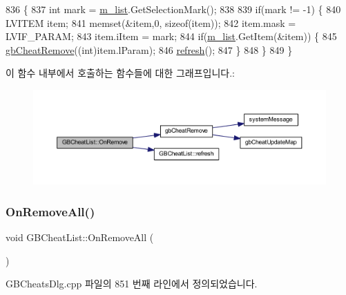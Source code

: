 \begin{DoxyCode}
836 \{
837   \textcolor{keywordtype}{int} mark = \mbox{\hyperlink{class_g_b_cheat_list_aca0eaf2ff30100f5d11e4c80193ad90e}{m\_list}}.GetSelectionMark();
838   
839   \textcolor{keywordflow}{if}(mark != -1) \{
840     LVITEM item;
841     memset(&item,0, \textcolor{keyword}{sizeof}(item));
842     item.mask = LVIF\_PARAM;
843     item.iItem = mark;
844     \textcolor{keywordflow}{if}(\mbox{\hyperlink{class_g_b_cheat_list_aca0eaf2ff30100f5d11e4c80193ad90e}{m\_list}}.GetItem(&item)) \{
845       \mbox{\hyperlink{gb_cheats_8cpp_af25734b3d027db822c230358cacedf10}{gbCheatRemove}}((\textcolor{keywordtype}{int})item.lParam);
846       \mbox{\hyperlink{class_g_b_cheat_list_a248cc28fa5e392d2f55d0f66ff6c5821}{refresh}}();
847     \}       
848   \}
849 \}
\end{DoxyCode}
이 함수 내부에서 호출하는 함수들에 대한 그래프입니다.\+:
\nopagebreak
\begin{figure}[H]
\begin{center}
\leavevmode
\includegraphics[width=350pt]{class_g_b_cheat_list_ae8c2c668dbb6ab9989c50efc60448a54_cgraph}
\end{center}
\end{figure}
\mbox{\label{class_g_b_cheat_list_a572e8d726efb4dcaed99de7b7f1a815d}} 
\subsubsection{\texorpdfstring{On\+Remove\+All()}{OnRemoveAll()}}
{\footnotesize\ttfamily void G\+B\+Cheat\+List\+::\+On\+Remove\+All (\begin{DoxyParamCaption}{ }\end{DoxyParamCaption})\hspace{0.3cm}{\ttfamily [protected]}}



G\+B\+Cheats\+Dlg.\+cpp 파일의 851 번째 라인에서 정의되었습니다.


